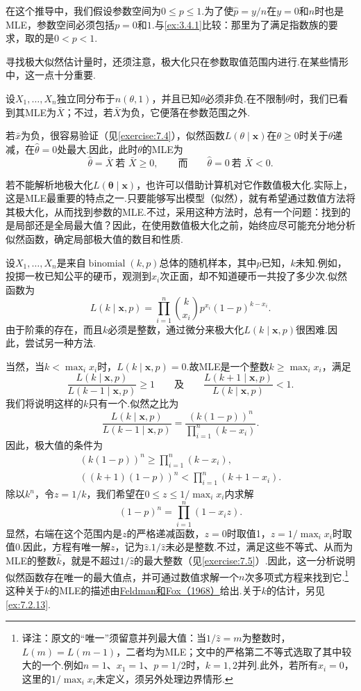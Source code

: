 在这个推导中，我们假设参数空间为$0\le p\le1$.为了使$\widehat p=y/n$在$y=0$和$n$时也是MLE，参数空间必须包括$p=0$和$1$.与\autoref{ex:3.4.1}比较：那里为了满足指数族的要求，取的是$0<p<1$.

寻找极大似然估计量时，还须注意，极大化只在参数取值范围内进行.在某些情形中，这一点十分重要.
\begin{example}[参数范围受限的MLE]\label{ex:7.2.8}
设$X_1,\ldots,X_n$独立同分布于$n(\theta,1)$，并且已知$\theta$必须非负.在不限制$\theta$时，我们已看到其MLE为$\bar X$；不过，若$\bar X$为负，它便落在参数范围之外.

若$\bar x$为负，很容易验证（见\autoref{exercise:7.4}），似然函数$L(\theta\mid\boldsymbol x)$在$\theta\ge0$时关于$\theta$递减，在$\widehat\theta=0$处最大.因此，此时$\theta$的MLE为
$$\widehat\theta=\bar X\ \text{若 }\bar X\ge0,\qquad\text{而}\qquad\widehat\theta=0\ \text{若 }\bar X<0.$$
\end{example}
若不能解析地极大化$L(\boldsymbol\theta\mid\boldsymbol x)$，也许可以借助计算机对它作数值极大化.实际上，这是MLE最重要的特点之一.只要能够写出模型（似然），就有希望通过数值方法将其极大化，从而找到参数的MLE.不过，采用这种方法时，总有一个问题：找到的是局部还是全局最大值？因此，在使用数值极大化之前，始终应尽可能充分地分析似然函数，确定局部极大值的数目和性质.
\begin{example}[试验次数未知的二项分布MLE]\label{ex:7.2.9}
设$X_1,\ldots,X_n$是来自$\operatorname{binomial}(k,p)$总体的随机样本，其中$p$已知，$k$未知.例如，投掷一枚已知公平的硬币，观测到$x_i$次正面，却不知道硬币一共投了多少次.似然函数为
$$L(k\mid\boldsymbol x,p)=\prod_{i=1}^n\binom k{x_i}p^{x_i}(1-p)^{k-x_i}.$$
由于阶乘的存在，而且$k$必须是整数，通过微分来极大化$L(k\mid\boldsymbol x,p)$很困难.因此，尝试另一种方法.

当然，当$k<\max_ix_i$时，$L(k\mid\boldsymbol x,p)=0$.故MLE是一个整数$k\ge\max_ix_i$，满足
$$\frac{L(k\mid\boldsymbol x,p)}{L(k-1\mid\boldsymbol x,p)}\ge1\qquad\text{及}\qquad\frac{L(k+1\mid\boldsymbol x,p)}{L(k\mid\boldsymbol x,p)}<1.$$
我们将说明这样的$k$只有一个.似然之比为
$$\frac{L(k\mid\boldsymbol x,p)}{L(k-1\mid\boldsymbol x,p)}=\frac{(k(1-p))^n}{\prod_{i=1}^n(k-x_i)}.$$
因此，极大值的条件为
\begin{gather*}
(k(1-p))^n\ge\prod_{i=1}^n(k-x_i),\\
((k+1)(1-p))^n<\prod_{i=1}^n(k+1-x_i).
\end{gather*}
除以$k^n$，令$z=1/k$，我们希望在$0\le z\le1/\max_ix_i$内求解
$$(1-p)^n=\prod_{i=1}^n(1-x_iz).$$
显然，右端在这个范围内是$z$的严格递减函数，$z=0$时取值1，$z=1/\max_ix_i$时取值0.因此，方程有唯一解$z$，记为$\widehat z$.$1/\widehat z$未必是整数.不过，满足这些不等式、从而为MLE的整数$\widehat k$，就是不超过$1/\widehat z$的最大整数（见\autoref{exercise:7.5}）.因此，这一分析说明似然函数存在唯一的最大值点，并可通过数值求解一个$n$次多项式方程来找到它.\footnote{译注：原文的“唯一”须留意并列最大值：当$1/\widehat z=m$为整数时，$L(m)=L(m-1)$，二者均为MLE；文中的严格第二不等式选取了其中较大的一个.例如$n=1$、$x_1=1$、$p=1/2$时，$k=1,2$并列.此外，若所有$x_i=0$，这里的$1/\max_ix_i$未定义，须另外处理边界情形.}这种关于$k$的MLE的描述由\hyperref[bib:source116]{Feldman和Fox（1968）}给出.关于$k$的估计，另见\autoref{ex:7.2.13}.
\end{example}
